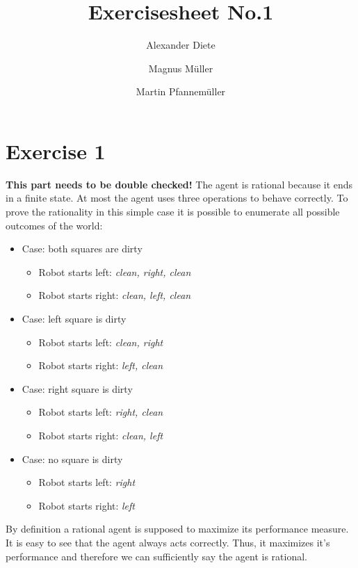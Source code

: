 \documentclass[11pt]{article}
\title{Exercisesheet No.1}
\author{Alexander Diete \and Magnus M\"uller \and Martin Pfannem\"uller}
\begin{document}
\maketitle
\section*{Exercise 1}
\textbf{This part needs to be double checked!}
The agent is rational because it ends in a finite state. At most the agent uses three operations to behave correctly. To prove the rationality in this simple case it is possible to enumerate all possible outcomes of the world:

\begin{itemize}
  \item Case: both squares are dirty
  \begin{itemize}
    \item Robot starts left: \textit{clean, right, clean}
    \item Robot starts right: \textit{clean, left, clean} 
  \end{itemize}
  \item Case: left square is dirty
  \begin{itemize}
    \item Robot starts left: \textit{clean, right}
    \item Robot starts right: \textit{left, clean} 
  \end{itemize}
  \item Case: right square is dirty
  \begin{itemize}
    \item Robot starts left: \textit{right, clean}
    \item Robot starts right: \textit{clean, left} 
  \end{itemize}
  \item Case: no square is dirty
  \begin{itemize}
    \item Robot starts left: \textit{right}
    \item Robot starts right: \textit{left} 
  \end{itemize}
\end{itemize}

\noindent
By definition a rational agent is supposed to maximize its performance measure. It is easy to see that the agent always acts correctly. Thus, it maximizes it's performance and therefore we can sufficiently say the agent is rational. 

\newpage
\end{document}
